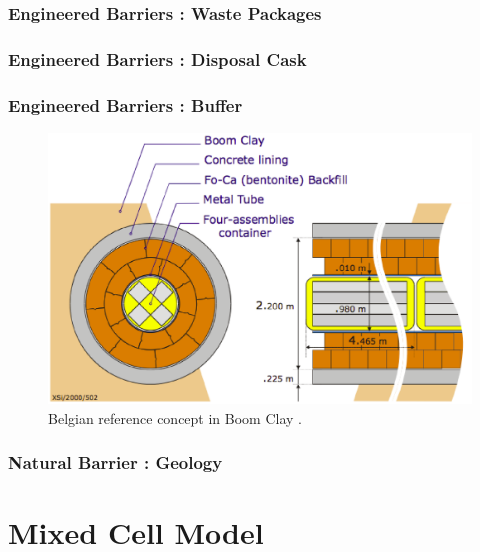 \begin{frame}[ctb!]
  \frametitle{Engineered Barriers : Waste Packages}
\footnotesize{
  
}
\end{frame}

\begin{frame}[ctb!]
  \frametitle{Engineered Barriers : Disposal Cask}
\footnotesize{
  
}
\end{frame}

\begin{frame}[ctb!]
  \frametitle{Engineered Barriers : Buffer}
\footnotesize{
  \begin{figure}[h!]
    \begin{center}
      \includegraphics[height=.7\textheight]{./images/belgianClayRedImp.eps}
    \end{center}
    \caption{Belgian reference concept in Boom Clay 
    \cite{von_lensa_red-impact_2008}.}
    \label{fig:belgianClayRedImp}
  \end{figure}
}
\end{frame}

\begin{frame}[ctb!]
  \frametitle{Natural Barrier : Geology}
\footnotesize{
  
}
\end{frame}

\setcounter{framenumber}{\value{finalframe}}
\section{Mixed Cell Model}

